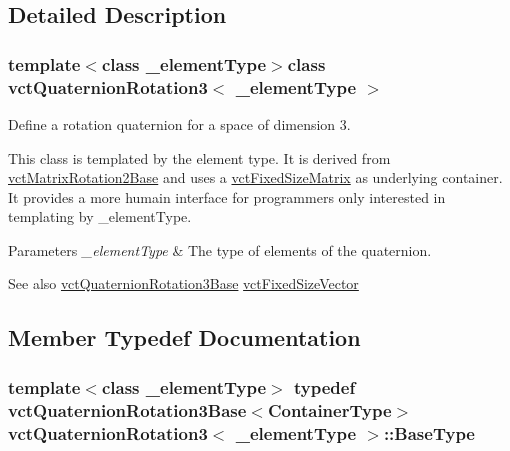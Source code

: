 \subsection{Detailed Description}
\subsubsection*{template$<$class \+\_\+element\+Type$>$class vct\+Quaternion\+Rotation3$<$ \+\_\+element\+Type $>$}

Define a rotation quaternion for a space of dimension 3. 

This class is templated by the element type. It is derived from \hyperlink{classvct_matrix_rotation2_base}{vct\+Matrix\+Rotation2\+Base} and uses a \hyperlink{classvct_fixed_size_matrix}{vct\+Fixed\+Size\+Matrix} as underlying container. It provides a more humain interface for programmers only interested in templating by \+\_\+element\+Type.


\begin{DoxyParams}{Parameters}
{\em \+\_\+element\+Type} & The type of elements of the quaternion.\\
\hline
\end{DoxyParams}
\begin{DoxySeeAlso}{See also}
\hyperlink{classvct_quaternion_rotation3_base}{vct\+Quaternion\+Rotation3\+Base} \hyperlink{classvct_fixed_size_vector}{vct\+Fixed\+Size\+Vector} 
\end{DoxySeeAlso}


\subsection{Member Typedef Documentation}
\hypertarget{classvct_quaternion_rotation3_aaeef12df3c8d36659b11c3c8df04905f}{}
\subsubsection[{Base\+Type}]{\setlength{\rightskip}{0pt plus 5cm}template$<$class \+\_\+element\+Type$>$ typedef {\bf vct\+Quaternion\+Rotation3\+Base}$<${\bf Container\+Type}$>$ {\bf vct\+Quaternion\+Rotation3}$<$ \+\_\+element\+Type $>$\+::{\bf Base\+Type}}\label{classvct_quaternion_rotation3_aaeef12df3c8d36659b11c3c8df04905f}
\hypertarget{classvct_quaternion_rotation3_a73c9511393f9a59206e3ca57c3564454}{}
